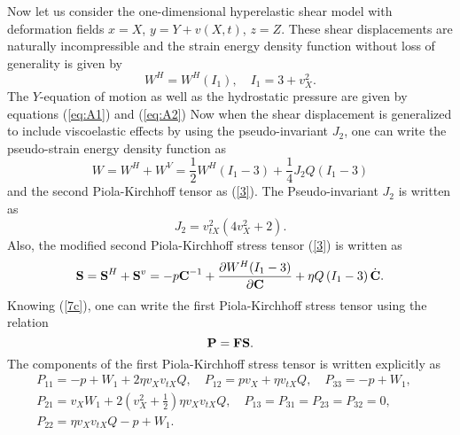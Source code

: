 \documentclass[11pt,letter,subeqn,fleqn]{article}
\numberwithin{equation}{section}
\numberwithin{table}{section}
\numberwithin{figure}{section}
\def\vec#1{{\boldsymbol{\rm #1}}} %
\def\vec#1{{\boldsymbol{\rm #1}}} %
\begin{document}
Now let us consider the one-dimensional hyperelastic shear model with deformation fields $x=X$, $y=Y+v(X,t)$, $z=Z$. These shear displacements are naturally incompressible and the strain energy density function without loss of generality is given by
\begin{equation}\label{4}
W^{H}=W^{H}(I_{1}), \quad I_{1}=3+v^{2}_{X}.
\end{equation}
The $Y$-equation of motion as well as the hydrostatic pressure are given by equations (\ref{eq:A1}) and (\ref{eq:A2})
Now when the shear displacement is generalized to include viscoelastic effects by using the pseudo-invariant $J_{2}$, one can write the pseudo-strain energy density function \cite{cheviakov2016one} as
\begin{equation}\label{7a}
W=W^{H}+W^{V}=\frac{1}{2}W^{H}(I_{1}-3)+\frac{1}{4}J_{2}Q(I_{1}-3)
\end{equation}
and the second Piola-Kirchhoff tensor as (\ref{3}). The Pseudo-invariant $J_{2}$ is written as
\begin{equation}\label{7b}
J_{2}=v^{2}_{tX}\left(4v^{2}_{X}+2\right).
\end{equation}
Also, the modified second Piola-Kirchhoff stress tensor (\ref{3}) is written as
\begin{equation}\label{7c}
\vec{S}=\vec{S}^{H}+\vec{S}^{v}=-p\vec{C}^{-1}+\frac{\partial W^{H}(I_{1}-3)}{\partial \vec{C}}+\eta Q\left(I_{1}-3\right)\dot{\vec{C}}.
\end{equation}
Knowing (\ref{7c}), one can write the first Piola-Kirchhoff stress tensor using the relation
\begin{equation*}\label{7d}
\vec{P}=\vec{F}\vec{S}.
\end{equation*}
The components of the first Piola-Kirchhoff stress tensor is written explicitly as
\begin{equation}\label{7e}
\begin{split}
P_{11}=-p+W_{1}+2\eta v_{X}v_{tX}Q, \quad P_{12}=pv_{X}+\eta v_{tX}Q, \quad P_{33}=-p+W_{1}, \quad \\ P_{21}=v_{X}W_{1}+2\left(v^{2}_{X}+\frac{1}{2}\right)\eta v_{X}v_{tX}Q,\quad P_{13}=P_{31}= P_{23}=P_{32}=0, \\P_{22}=\eta v_{X}v_{tX}Q-p+W_{1}.
\end{split}
\end{equation}
\end{document}
